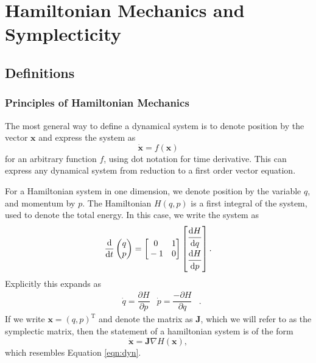 \documentclass{report}
\theoremstyle{exampstyle} \newtheorem{example}[theorem]{Example}
\theoremstyle{exampstyle} \newtheorem{remark}[theorem]{Remark}
\theoremstyle{exampstyle} \newtheorem{definition}[theorem]{Definition}
\theoremstyle{exampstyle} \newtheorem{lemma}[theorem]{Lemma}
\begin{document}
\chapter{Hamiltonian Mechanics and Symplecticity}

\section{Definitions}

\subsection{Principles of Hamiltonian Mechanics}

The most general way to define a dynamical system is to denote position by the vector $\mathbf{x}$ and express the system as
\begin{equation}
	\mathbf{\dot{x}} = f(\mathbf{x})
	\label{eqn:dyn}
\end{equation}
for an arbitrary function $f$, using dot notation for time derivative.
This can express any dynamical system from reduction to a first order vector equation.

For a Hamiltonian system in one dimension, we denote position by the variable $q$, and momentum by $p$.
The Hamiltonian $H(q,p)$ is a first integral of the system, used to denote the total energy.
In this case, we write the system as
\begin{equation}
	\dfrac{\mathrm{d}}{\mathrm{d}t}\begin{pmatrix}
		q \\
		p
	\end{pmatrix} = \begin{bmatrix}
		\strut 0 & \strut 1 \\
		\strut -1 & \strut 0
	\end{bmatrix}\begin{bmatrix}
	\dfrac{\strut\mathrm{d}H}{\strut\mathrm{d}q} \\
	\dfrac{\strut\mathrm{d}H}{\strut\mathrm{d}p}
	\end{bmatrix}.
\end{equation}
Explicitly this expands as
\begin{align*}
	&\dot{q} = \dfrac{\partial H}{\partial p}
	&
	\dot{p} = \dfrac{-\partial H}{\partial q}&.	
\end{align*}
If we write $\mathbf{x} = (q,p)^\mathrm{T}$ and denote the matrix as $\mathbf{J}$, which we will refer to as the symplectic matrix,
then the statement of a hamiltonian system is of the form 
\begin{equation}
	\mathbf{\dot{x}} = \mathbf{J}\nabla H(\mathbf{x}),
	\label{eqn:hdyn}
\end{equation}
which resembles Equation \ref{eqn:dyn}.
\end{document}
